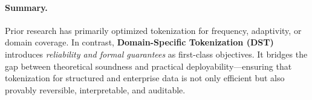 \paragraph{Summary.}
Prior research has primarily optimized tokenization for frequency, adaptivity, or domain coverage.
In contrast, \textbf{Domain-Specific Tokenization (DST)} introduces \emph{reliability and formal guarantees} as first-class objectives.
It bridges the gap between theoretical soundness and practical deployability—ensuring that tokenization for structured and enterprise data is not only efficient but also provably reversible, interpretable, and auditable.
